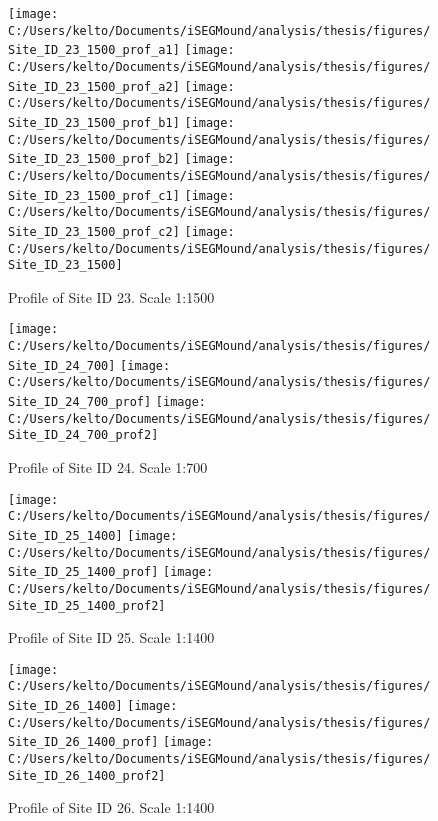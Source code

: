 \documentclass[
  12pt,
]{article}
\begin{document}
\begin{figure}
\texttt{[image: C:/Users/kelto/Documents/iSEGMound/analysis/thesis/figures/Site\_ID\_23\_1500\_prof\_a1]} \texttt{[image: C:/Users/kelto/Documents/iSEGMound/analysis/thesis/figures/Site\_ID\_23\_1500\_prof\_a2]} \texttt{[image: C:/Users/kelto/Documents/iSEGMound/analysis/thesis/figures/Site\_ID\_23\_1500\_prof\_b1]} \texttt{[image: C:/Users/kelto/Documents/iSEGMound/analysis/thesis/figures/Site\_ID\_23\_1500\_prof\_b2]} \texttt{[image: C:/Users/kelto/Documents/iSEGMound/analysis/thesis/figures/Site\_ID\_23\_1500\_prof\_c1]} \texttt{[image: C:/Users/kelto/Documents/iSEGMound/analysis/thesis/figures/Site\_ID\_23\_1500\_prof\_c2]} \texttt{[image: C:/Users/kelto/Documents/iSEGMound/analysis/thesis/figures/Site\_ID\_23\_1500]} \caption{Profile of Site ID 23. Scale 1:1500}\label{fig:FigureAOI3-23}
\end{figure}

\begin{figure}
\texttt{[image: C:/Users/kelto/Documents/iSEGMound/analysis/thesis/figures/Site\_ID\_24\_700]} \texttt{[image: C:/Users/kelto/Documents/iSEGMound/analysis/thesis/figures/Site\_ID\_24\_700\_prof]} \texttt{[image: C:/Users/kelto/Documents/iSEGMound/analysis/thesis/figures/Site\_ID\_24\_700\_prof2]} \caption{Profile of Site ID 24. Scale 1:700}\label{fig:FigureAOI3-24}
\end{figure}

\begin{figure}
\texttt{[image: C:/Users/kelto/Documents/iSEGMound/analysis/thesis/figures/Site\_ID\_25\_1400]} \texttt{[image: C:/Users/kelto/Documents/iSEGMound/analysis/thesis/figures/Site\_ID\_25\_1400\_prof]} \texttt{[image: C:/Users/kelto/Documents/iSEGMound/analysis/thesis/figures/Site\_ID\_25\_1400\_prof2]} \caption{Profile of Site ID 25. Scale 1:1400}\label{fig:FigureAOI3-25}
\end{figure}

\begin{figure}
\texttt{[image: C:/Users/kelto/Documents/iSEGMound/analysis/thesis/figures/Site\_ID\_26\_1400]} \texttt{[image: C:/Users/kelto/Documents/iSEGMound/analysis/thesis/figures/Site\_ID\_26\_1400\_prof]} \texttt{[image: C:/Users/kelto/Documents/iSEGMound/analysis/thesis/figures/Site\_ID\_26\_1400\_prof2]} \caption{Profile of Site ID 26. Scale 1:1400}\label{fig:FigureAOI3-26}
\end{figure}
\end{document}
